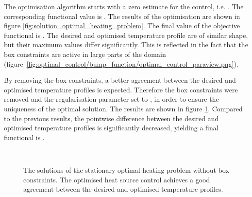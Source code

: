 \documentclass[prodmode,acmtoms]{acmsmall}
\begin{document}
The optimisation algorithm starts with a zero estimate for the control, i.e. .
The corresponding functional value is . 
The results of the optimisation are shown in figure \ref{fig:solution_optimal_heating_problem}. 
The final value of the objective functional is . 
The desired and optimised temperature profile are of similar shape, but their maximum values differ significantly. 
This is reflected in the fact that the box constraints are active in large parts of the domain (figure~\ref{fig:optimal_control/bump_function/optimal_control_paraview.png}).

By removing the box constraints, a better agreement between the desired and optimised temperature profiles is expected.
Therefore the box constraints were removed and the regularisation parameter set to , in order to ensure the uniqueness of the optimal solution.
The results are shown in figure \ref{fig:solution_optimal_heating_problem_without_bounds}. 
Compared to the previous results, the pointwise difference between the desired and optimised temperature profiles is significantly decreased,
yielding a final functional is .

\begin{figure}[t]
\centering
        \\
        \caption{The solutions of the stationary optimal heating problem without box constraints. The optimised heat source control achieves a good agreement between the desired and optimised temperature profiles.}\label{fig:solution_optimal_heating_problem_without_bounds}
\end{figure}
\end{document}
